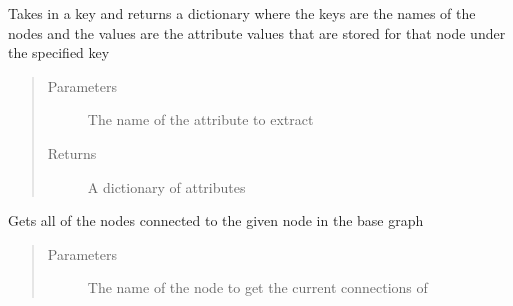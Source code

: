 \documentclass[letterpaper,10pt,english]{sphinxmanual}
\begin{document}
\begin{fulllineitems}
\begin{fulllineitems}
\begin{quote}
\begin{description}
\end{description}\end{quote}

\end{fulllineitems}


\begin{fulllineitems}
\label{\detokenize{source/yawning_titan.envs.generic.core:yawning_titan.envs.generic.core.network_interface.NetworkInterface.get_attributes_from_key}}
\sphinxAtStartPar
Takes in a key and returns a dictionary where the keys are the names of the nodes and the values are the
attribute values that are stored for that node under the specified key
\begin{quote}\begin{description}
\item[{Parameters}] \leavevmode
\sphinxAtStartPar
{} \textendash{} The name of the attribute to extract

\item[{Returns}] \leavevmode
\sphinxAtStartPar
A dictionary of attributes

\end{description}\end{quote}

\end{fulllineitems}


\begin{fulllineitems}
\label{\detokenize{source/yawning_titan.envs.generic.core:yawning_titan.envs.generic.core.network_interface.NetworkInterface.get_base_connected_nodes}}
\sphinxAtStartPar
Gets all of the nodes connected to the given node in the base graph
\begin{quote}\begin{description}
\item[{Parameters}] \leavevmode
\sphinxAtStartPar
{} \textendash{} The name of the node to get the current connections of


\end{description}
\end{quote}
\end{fulllineitems}
\end{fulllineitems}
\end{document}
